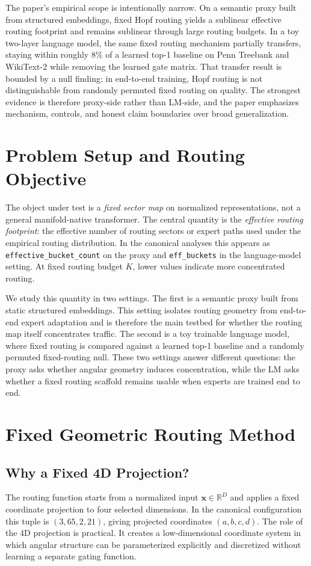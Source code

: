 \documentclass[10pt,twocolumn]{article}
\begin{document}
The paper's empirical scope is intentionally narrow. On a semantic proxy built from structured embeddings, fixed Hopf routing yields a sublinear effective routing footprint and remains sublinear through large routing budgets. In a toy two-layer language model, the same fixed routing mechanism partially transfers, staying within roughly $8\%$ of a learned top-1 baseline on Penn Treebank and WikiText-2 while removing the learned gate matrix. That transfer result is bounded by a null finding: in end-to-end training, Hopf routing is not distinguishable from randomly permuted fixed routing on quality. The strongest evidence is therefore proxy-side rather than LM-side, and the paper emphasizes mechanism, controls, and honest claim boundaries over broad generalization.

\newpage

\section{Problem Setup and Routing Objective}
The object under test is a \emph{fixed sector map} on normalized representations, not a general manifold-native transformer. The central quantity is the \emph{effective routing footprint}: the effective number of routing sectors or expert paths used under the empirical routing distribution. In the canonical analyses this appears as \texttt{effective\_bucket\_count} on the proxy and \texttt{eff\_buckets} in the language-model setting. At fixed routing budget $K$, lower values indicate more concentrated routing.

We study this quantity in two settings. The first is a semantic proxy built from static structured embeddings. This setting isolates routing geometry from end-to-end expert adaptation and is therefore the main testbed for whether the routing map itself concentrates traffic. The second is a toy trainable language model, where fixed routing is compared against a learned top-1 baseline and a randomly permuted fixed-routing null. These two settings answer different questions: the proxy asks whether angular geometry induces concentration, while the LM asks whether a fixed routing scaffold remains usable when experts are trained end to end.

\section{Fixed Geometric Routing Method}
\subsection{Why a Fixed 4D Projection?}
The routing function starts from a normalized input $\mathbf{x}\in\mathbb{R}^D$ and applies a fixed coordinate projection to four selected dimensions. In the canonical configuration this tuple is $(3,65,2,21)$, giving projected coordinates $(a,b,c,d)$. The role of the 4D projection is practical. It creates a low-dimensional coordinate system in which angular structure can be parameterized explicitly and discretized without learning a separate gating function.
\end{document}
